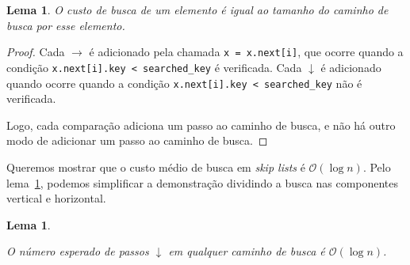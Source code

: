 \documentclass[paper=a4, fontsize=11pt]{scrartcl} %
\newtheorem{lemma}[theorem]{Lema}
\numberwithin{equation}{section}
\numberwithin{figure}{section}
\numberwithin{table}{section}
\numberwithin{definition}{section}
\numberwithin{theorem}{section}
\numberwithin{property}{section}
\numberwithin{proposition}{section}
\newcommand{\cO}{\ensuremath{\mathcal{O}}}
\newcommand{\sls}{\textit{skip lists}\xspace}
\begin{document}
\begin{lemma} \label{lemma:custo_busca_caminho}
O custo de busca de um elemento é igual ao tamanho do caminho de busca por esse elemento.
\end{lemma}

\begin{proof}
Cada $\rightarrow$ é adicionado pela chamada \verb|x = x.next[i]|, que ocorre quando a condição
\verb|x.next[i].key < searched_key| é verificada. 
Cada $\downarrow$ é adicionado quando ocorre quando a condição \verb|x.next[i].key < searched_key| 
não é verificada.

Logo, cada comparação adiciona um passo ao caminho de busca, e não há outro modo de adicionar um passo ao
caminho de busca.
\end{proof}

Queremos mostrar que o custo médio de busca em \sls é $\cO(\log n)$. Pelo lema~\ref{lemma:custo_busca_caminho},
podemos simplificar a demonstração dividindo a busca nas componentes vertical e horizontal.

\begin{lemma} \label{lemma:downarrow}

O número esperado de passos $\downarrow$ em qualquer caminho de busca é $\cO(\log n)$.

\end{lemma}
\end{document}
